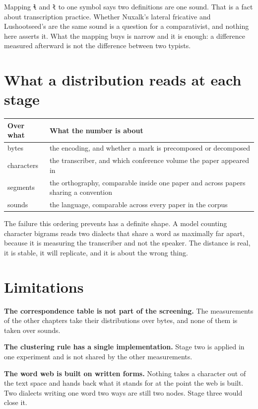 Mapping \texttt{ɬ} and \texttt{ł} to one symbol says two definitions are one sound. That is a fact
about transcription practice. Whether Nuxalk's lateral fricative and Lushootseed's are the same
sound is a question for a comparativist, and nothing here asserts it. What the mapping buys is
narrow and it is enough: a difference measured afterward is not the difference between two typists.

\section{What a distribution reads at each stage}

\tiny
\setlength{\tabcolsep}{2pt}
\begin{longtable}{@{}>{\arraybackslash}p{}>{\arraybackslash}p{}@{}}
\toprule
Over what & What the number is about \\
\midrule
bytes & the encoding, and whether a mark is precomposed or decomposed \\
characters & the transcriber, and which conference volume the paper appeared in \\
segments & the orthography, comparable inside one paper and across papers sharing a convention \\
sounds & the language, comparable across every paper in the corpus \\
\bottomrule
\end{longtable}
\normalsize

The failure this ordering prevents has a definite shape. A model counting character bigrams reads
two dialects that share a word as maximally far apart, because it is measuring the transcriber and
not the speaker. The distance is real, it is stable, it will replicate, and it is about the wrong
thing.

\section{Limitations}

\textbf{The correspondence table is not part of the screening.} The measurements of the other
chapters take their distributions over bytes, and none of them is taken over sounds.

\textbf{The clustering rule has a single implementation.} Stage two is applied in one experiment and
is not shared by the other measurements.

\textbf{The word web is built on written forms.} Nothing takes a character out of the text space and
hands back what it stands for at the point the web is built. Two dialects writing one word two ways
are still two nodes. Stage three would close it.
